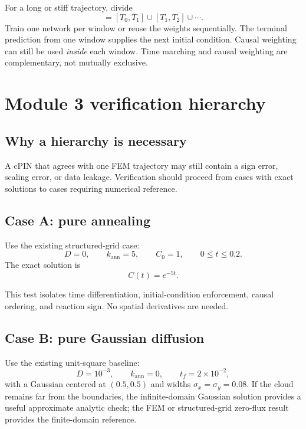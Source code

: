 \documentclass[11pt]{article}
\begin{document}
For a long or stiff trajectory, divide
\begin{equation}
[0,T_f]
=
[T_0,T_1]\cup[T_1,T_2]\cup\cdots.
\end{equation}
Train one network per window or reuse the weights sequentially. The terminal prediction from one window supplies the next initial condition. Causal weighting can still be used \emph{inside} each window. Time marching and causal weighting are complementary, not mutually exclusive.

\section{Module 3 verification hierarchy}

\subsection{Why a hierarchy is necessary}

A cPIN that agrees with one FEM trajectory may still contain a sign error, scaling error, or data leakage. Verification should proceed from cases with exact solutions to cases requiring numerical reference.

\subsection{Case A: pure annealing}

Use the existing structured-grid case:
\begin{equation}
D=0,
\qquad
k_{\mathrm{ann}}=5,
\qquad
C_0=1,
\qquad
0\le t\le0.2.
\end{equation}
The exact solution is
\begin{equation}
C(t)=e^{-5t}.
\label{eq:pure_anneal_exact}
\end{equation}

This test isolates time differentiation, initial-condition enforcement, causal ordering, and reaction sign. No spatial derivatives are needed.

\subsection{Case B: pure Gaussian diffusion}

Use the existing unit-square baseline:
\begin{equation}
D=10^{-3},
\qquad
k_{\mathrm{ann}}=0,
\qquad
t_f=2\times10^{-2},
\end{equation}
with a Gaussian centered at $(0.5,0.5)$ and widths $\sigma_x=\sigma_y=0.08$. If the cloud remains far from the boundaries, the infinite-domain Gaussian solution provides a useful approximate analytic check; the FEM or structured-grid zero-flux result provides the finite-domain reference.
\end{document}
